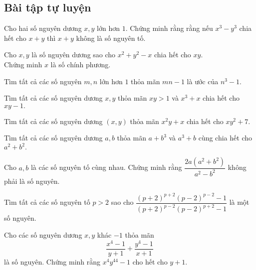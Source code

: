 \subsection*{Bài tập tự luyện}


\begin{btt}
Cho hai số nguyên dương $x,y$ lớn hơn $1.$ Chứng minh rằng rằng nếu $x^{3}-y^{3}$ chia hết cho $x+y$ thì $x+y$ không là số nguyên tố.
\end{btt}

\begin{btt} \label{bdscp1}
Cho $x, y$ là số nguyên dương sao cho $x^{2}+y^{2}-x$ chia hết cho $x y$. \\Chứng minh $x$ là số chính phương.
\end{btt}

\begin{btt}
Tìm tất cả các số nguyên $m,n$ lớn hơn $1$ thỏa mãn $mn-1$ là ước của $n^3-1.$
\end{btt}

\begin{btt}
Tìm tất cả các số nguyên dương $x,y$ thỏa mãn $xy>1$ và $x^3+x$ chia hết cho $xy-1.$
\end{btt}


\begin{btt}
Tìm tất cả các số nguyên dương $(x,y)$ thỏa mãn $x^2y+x$ chia hết cho $xy^2+7.$
\end{btt}

\begin{btt}
Tìm tất cả các số nguyên dương $a,b$ thỏa mãn $a+b^3$ và $a^3+b$ cùng chia hết cho $a^2+b^2.$
\end{btt}

\begin{btt}
Cho $a,b$ là các số nguyên tố cùng nhau. Chứng minh rằng $\dfrac{2 a\left(a^{2}+b^{2}\right)}{a^{2}-b^{2}}$ không phải là số nguyên.
\end{btt}

\begin{btt}
Tìm tất cả các số nguyên tố $p>2$ sao cho $\dfrac{(p+2)^{p+2}(p-2)^{p-2} - 1}{(p+2)^{p-2}(p-2)^{p+2}- 1}$ là một số nguyên.
\end{btt}

\begin{btt}
Cho các số nguyên dương $x,y$ khác $-1$ thỏa mãn
$$\dfrac{x^4-1}{y+1}+\dfrac{y^4-1}{x+1}$$
là số nguyên. Chứng minh rằng $x^4y^{44}-1$ cho hết cho $y+1.$
\end{btt}

